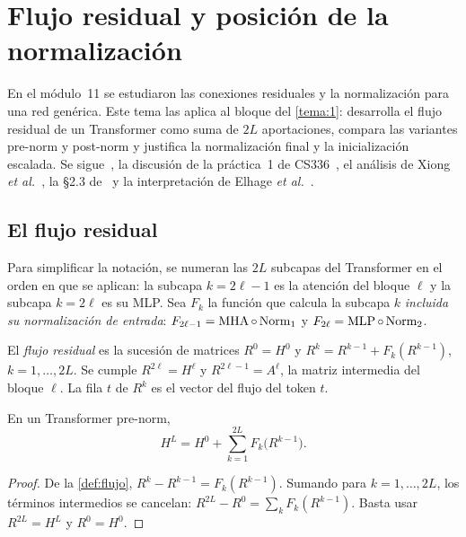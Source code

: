 \chapter{Flujo residual y posición de la normalización}
\label{tema:2}

En el módulo~11 se estudiaron las conexiones residuales y la normalización para una red genérica. Este tema las aplica al bloque del \cref{tema:1}: desarrolla el flujo residual de un Transformer como suma de $2L$ aportaciones, compara las variantes pre-norm y post-norm y justifica la normalización final y la inicialización escalada. Se sigue~\cite[§7.2]{jm3}, la discusión de la práctica~1 de CS336~\cite[§3.4]{cs336}, el análisis de Xiong \emph{et al.}~\cite{xiong}, la §2.3 de~\cite{gpt2} y la interpretación de Elhage \emph{et al.}~\cite{elhage}.

\section{El flujo residual}

Para simplificar la notación, se numeran las $2L$ subcapas del Transformer en el orden en que se aplican: la subcapa $k=2\ell-1$ es la atención del bloque $\ell$ y la subcapa $k=2\ell$ es su MLP. Sea $F_k$ la función que calcula la subcapa $k$ \emph{incluida su normalización de entrada}: $F_{2\ell-1}=\operatorname{MHA}\circ\operatorname{Norm}_1$ y $F_{2\ell}=\operatorname{MLP}\circ\operatorname{Norm}_2$.

\begin{definicion}\label{def:flujo}
El \emph{flujo residual} es la sucesión de matrices $R^{0}=H^{0}$ y $R^{k}=R^{k-1}+F_k(R^{k-1})$, $k=1,\dots,2L$. Se cumple $R^{2\ell}=H^{\ell}$ y $R^{2\ell-1}=A^{\ell}$, la matriz intermedia del bloque $\ell$. La fila $t$ de $R^{k}$ es el vector del flujo del token $t$.
\end{definicion}

\begin{proposicion}\label{prop:telescopica}
En un Transformer pre-norm,
\[
H^{L}=H^{0}+\sum_{k=1}^{2L}F_k\bigl(R^{k-1}\bigr).
\]
\end{proposicion}

\begin{proof}
De la \cref{def:flujo}, $R^{k}-R^{k-1}=F_k(R^{k-1})$. Sumando para $k=1,\dots,2L$, los términos intermedios se cancelan: $R^{2L}-R^{0}=\sum_{k}F_k(R^{k-1})$. Basta usar $R^{2L}=H^{L}$ y $R^{0}=H^{0}$.
\end{proof}

